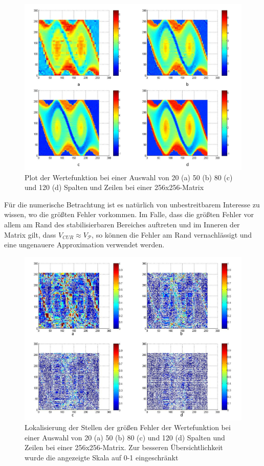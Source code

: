 \documentclass[12pt,a4paper,twoside]{article}
\begin{document}
	\begin{figure}[h]
		\center
		\includegraphics[scale=0.3]{CUR_valuefunctions}
		\caption{Plot der Wertefunktion bei einer Auswahl von 20 (a) 50 (b) 80 (c) und 120 (d) Spalten und Zeilen bei einer 256x256-Matrix}
	\end{figure}
	\newpage
	Für die numerische Betrachtung ist es natürlich von unbestreitbarem Interesse zu wissen, wo die größten 
	Fehler vorkommen. Im Falle, dass die größten Fehler vor allem am Rand des stabilisierbaren Bereiches auftreten 
	und im Inneren der Matrix gilt, dass $V_{CUR}\approx V_\mathcal{P}$, so können die Fehler am Rand 
	vernachlässigt und eine ungenauere Approximation verwendet werden. 
	\begin{figure}[h]
		\center
		\includegraphics[scale=0.3]{CUR_fehlerstellen}
		\caption{Lokalisierung der Stellen der größen Fehler der Wertefunktion bei einer Auswahl von 20 (a) 50 (b) 80 (c) und 120 (d) Spalten und Zeilen bei einer 256x256-Matrix. Zur besseren Übersichtlichkeit wurde die angezeigte Skala auf 0-1 eingeschränkt}
	\end{figure}
	\newpage

\end{document}
